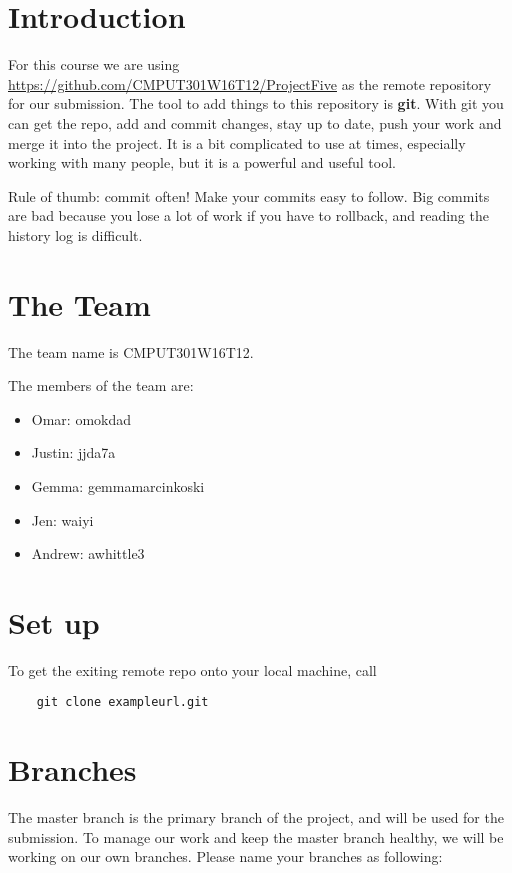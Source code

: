 \documentclass[14pt]{report}
\begin{document}
	\section{Introduction}
	
	For this course we are using \url{https://github.com/CMPUT301W16T12/ProjectFive} as the remote repository for our submission.
	The tool to add things to this repository is \textbf{git}.
	With git you can get the repo, add and commit changes, stay up to date, push your work and merge it into the project.
	It is a bit complicated to use at times, especially working with many people, but it is a powerful and useful tool.
	
	Rule of thumb: commit often!
	Make your commits easy to follow.
	Big commits are bad because you lose a lot of work if you have to rollback, and reading the history log is difficult.
	
	\section{The Team}
	
	The team name is CMPUT301W16T12.
	
	The members of the team are:
	\begin{itemize}
		\item
		Omar: omokdad
		\item
		Justin: jjda7a
		\item
		Gemma: gemmamarcinkoski
		\item
		Jen: waiyi
		\item
		Andrew: awhittle3
	\end{itemize}
	
	\section{Set up}
	To get the exiting remote repo onto your local machine, call
	\begin{verbatim}
	git clone exampleurl.git
	\end{verbatim}
	
	
	\section{Branches}
	
	The master branch is the primary branch of the project, and will be used for the submission.
	To manage our work and keep the master branch healthy, we will be working on our own branches.
	Please name your branches as following:
	
\end{document}
